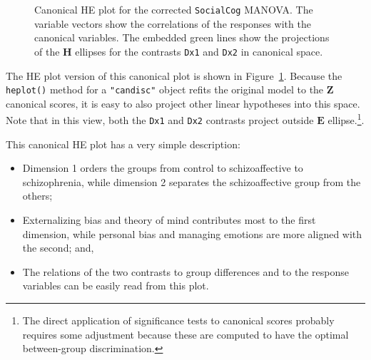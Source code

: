 \documentclass[
  letterpaper,
  10pt,
  krantz2]{krantz}
\providecommand{\tightlist}{%
  \setlength{\itemsep}{0pt}\setlength{\parskip}{0pt}}\usepackage{longtable,booktabs,array}
\begin{document}
{\begin{figure}[H]


\caption{\label{fig-SC1-hecan}Canonical HE plot for the corrected
\texttt{SocialCog} MANOVA. The variable vectors show the correlations of
the responses with the canonical variables. The embedded green lines
show the projections of the \textbf{H} ellipses for the contrasts
\texttt{Dx1} and \texttt{Dx2} in canonical space.}

\end{figure}%

The HE plot version of this canonical plot is shown in
Figure~\ref{fig-SC1-hecan}. Because the \texttt{heplot()} method for a
\texttt{"candisc"} object refits the original model to the
\(\mathbf{Z}\) canonical scores, it is easy to also project other linear
hypotheses into this space. Note that in this view, both the
\texttt{Dx1} and \texttt{Dx2} contrasts project outside \(\mathbf{E}\)
ellipse.\footnote{The direct application of significance tests to
  canonical scores probably requires some adjustment because these are
  computed to have the optimal between-group discrimination.}.

This canonical HE plot has a very simple description:

\begin{itemize}
\tightlist
\item
  Dimension 1 orders the groups from control to schizoaffective to
  schizophrenia, while dimension 2 separates the schizoaffective group
  from the others;
\item
  Externalizing bias and theory of mind contributes most to the first
  dimension, while personal bias and managing emotions are more aligned
  with the second; and,
\item
  The relations of the two contrasts to group differences and to the
  response variables can be easily read from this plot.
\end{itemize}

}
\end{document}
